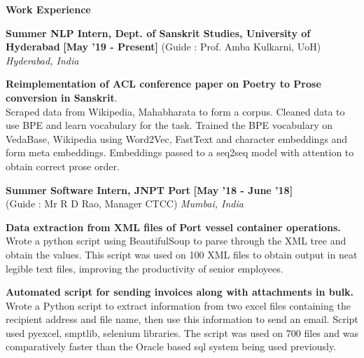 \documentclass[a4paper,10pt]{article}
\begin{document}
\colorbox{titleColor}{\parbox{6.7in}{\textbf{Work Experience}}}


\begin{itemize*}
  \setlength{\itemsep}{.00pt}
  \item \textbf{{Summer NLP Intern, Dept. of Sanskrit Studies, University of Hyderabad}} \hfill {\small{{\textbf{[May '19 - Present]}}\/}}
  {(Guide : Prof. Amba Kulkarni, UoH)}
  \hfill {\small{{\textit{Hyderabad, India}}\/}}
      \begin{itemize*}
      \item \textbf{Reimplementation of ACL conference paper on Poetry to Prose conversion in Sanskrit}.\\
       Scraped data from Wikipedia, Mahabharata to form a corpus. Cleaned data to use BPE and learn vocabulary for the task. Trained the BPE vocabulary on VedaBase, Wikipedia using Word2Vec, FastText and character embeddings and form meta embeddings. Embeddings passed to a seq2seq model with attention to obtain correct prose order.
      \end{itemize*}   
\end{itemize*}

\begin{itemize*}
  \setlength{\itemsep}{.00pt}
  \item \textbf{{Summer Software Intern, JNPT Port}} 
  \hfill {\small{{\textbf{[May '18 - June '18]}}\/}}
    \\{(Guide : Mr R D Rao, Manager CTCC)}
  \hfill {\small{{\textit{Mumbai, India}}\/}}
      \begin{itemize*}
       \item \textbf{Data extraction from XML files of Port vessel container operations.}
       \\Wrote a python script using BeautifulSoup to parse through the XML tree and
       obtain the values. This script was used on 100 XML files to obtain output in neat legible text files, improving the productivity of senior employees.
      \end{itemize*}
      \begin{itemize*}
       \item \textbf{Automated script for sending invoices along with attachments in bulk.}
       \\Wrote a Python script to extract information from two excel files containing the recipient address and file name, then use this information to send an email.
       Script used pyexcel, smptlib, selenium libraries. The script was used on 700 files and was comparatively faster than the Oracle based sql system being used previously.
      \end{itemize*}   
\end{itemize*}
 
\end{document}
